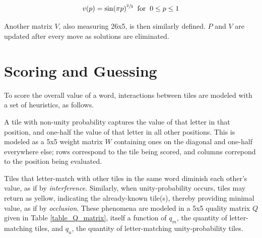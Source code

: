 \documentclass[twocolumn]{tudelft-aiaa}
\begin{document}
\begin{equation}
\label{equation_p_vs_v}
v(p) = \sin (\pi p) ^ {\sfrac{2}{3}} \hspace{2mm} \text{for} \hspace{2mm} 0 \leq p \leq 1
\end{equation}


Another matrix $V$, also measuring 26x5, is then similarly defined. $P$ and $V$ are updated after every move as solutions are eliminated.

\section{Scoring and Guessing}

To score the overall value of a word, interactions between tiles are modeled with a set of heuristics, as follows.

A tile with non-unity probability captures the value of that letter in that position, and one-half the value of that letter in all other positions. This is modeled as a 5x5 weight matrix $W$ containing ones on the diagonal and one-half everywhere else; rows correspond to the tile being scored, and columns correpond to the position being evaluated.

Tiles that letter-match with other tiles in the same word diminish each other's value, as if by \emph{interference}. Similarly, when unity-probability occurs, tiles may return as yellow, indicating the already-known tile(s), thereby providing minimal value, as if by \emph{occlusion}. These phenomena are modeled in a 5x5 quality matrix $Q$ given in Table \ref{table_Q_matrix}, itself a function of $q_m$, the quantity of letter-matching tiles, and $q_u$, the quantity of letter-matching unity-probability tiles.
\end{document}
